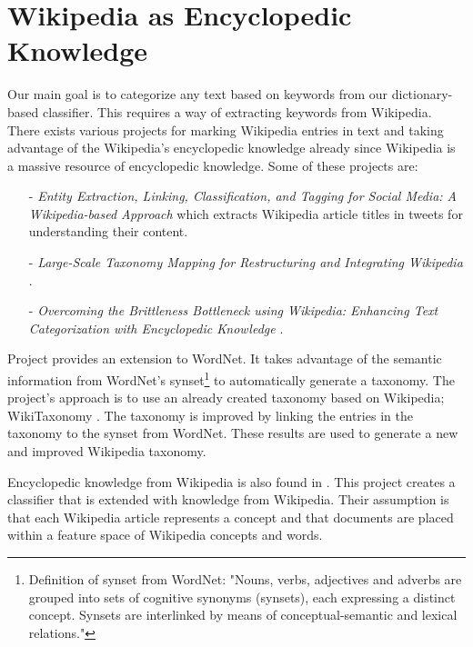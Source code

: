 \section{Wikipedia as Encyclopedic Knowledge}
\label{sec:extracting_keywords}

Our main goal is to categorize any text based on keywords from our dictionary-based classifier. This requires a way of extracting keywords from Wikipedia. There exists various projects for marking Wikipedia entries in text and taking advantage of the Wikipedia's encyclopedic knowledge already since Wikipedia is a massive resource of  encyclopedic knowledge. Some of these projects are: 
\begin{itemize}
\item[-] \emph{Entity Extraction, Linking, Classification, and Tagging for Social Media: A Wikipedia-based Approach} \cite{entityextraction} which extracts Wikipedia article titles in tweets for understanding their content. 
\item[-]  \emph{Large-Scale Taxonomy Mapping for Restructuring and Integrating Wikipedia} \cite{ponzetto2009large}.
\item[-] \emph{Overcoming the Brittleness Bottleneck using Wikipedia: Enhancing Text Categorization with Encyclopedic Knowledge} \cite{brittleness}.
\end{itemize}  

Project \cite{ponzetto2009large} provides an extension to WordNet. It takes advantage of the semantic information from WordNet's synset\footnote{Definition of synset from WordNet: "Nouns, verbs, adjectives and adverbs are grouped into sets of cognitive synonyms (synsets), each expressing a distinct concept. Synsets are interlinked by means of conceptual-semantic and lexical relations."\cite{wordnet}} to automatically generate a taxonomy. The project's approach is to use an already created taxonomy based on Wikipedia; WikiTaxonomy \cite{ponzetto2008wikitaxonomy}.  The taxonomy is improved by linking the entries in the taxonomy to the synset from WordNet. These results are used to generate a new and improved Wikipedia taxonomy. 

Encyclopedic knowledge from Wikipedia is also found in \cite{brittleness}. This project creates a classifier that is extended with knowledge from Wikipedia. Their assumption is that each Wikipedia article represents a concept and that documents are placed within a feature space of Wikipedia concepts and words. 

